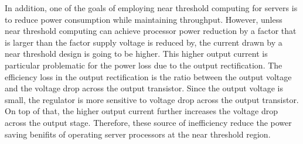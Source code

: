 In addition,  one of the goals of employing near threshold computing for servers
is to reduce power consumption while maintaining throughput. However, unless
near threshold computing can achieve processor power reduction by a factor that
is larger than the factor supply voltage is reduced by, the current drawn by a
near threshold design is going to be higher. This higher output current is
particular problematic for the power loss due to the output rectification. The
efficiency loss in the output rectification is the ratio between the output
voltage and the voltage drop across the output transistor. Since the output
voltage is small, the regulator is more sensitive to voltage drop across the
output transistor. On top of that, the higher output current further increases
the voltage drop across the output stage. Therefore, these source of inefficiency reduce the power saving benifits of operating server processors at the near threshold region.  

